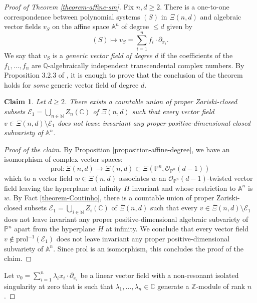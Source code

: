 \documentclass[12pt]{amsart}
\renewcommand{\P}{\mathbb{P}}
\theoremstyle{definition}
\theoremstyle{plain}
\newtheorem{claim}{Claim}
\theoremstyle{exampstyle}
\theoremstyle{exampstyle}\newtheorem{thmxbis}{Theorem}
\numberwithin{equation}{section}
\theoremstyle{remark}
\begin{document}
\begin{proof}[Proof of Theorem \ref{theorem-affine-sm}] 
Fix $n,d \geq 2$. There is a one-to-one correspondence between polynomial systems $(S)$ in $\Xi(n,d)$ and algebraic vector fields $v_S$ on the affine space $\mathbb{A}^n$ of degree $\leq d$ given by 
$$ (S) \mapsto v_S = \sum_{i = 1}^n f_i \cdot \partial_{x_i}.$$
We say that $v_S$ is a {\em generic vector field of degree $d$} if the coefficients of the $f_1,\ldots, f_n$ are $\mathbb{Q}$-algebraically independent transcendental complex numbers. By Proposition 3.2.3 of \cite{jaoui-ANT}, it is enough to prove that the conclusion of the theorem holds for \textit{some} generic vector field of degree $d$. 

\setcounter{claim}{0}

\begin{claim} 
Let $d \geq 2$. There exists a countable union of proper Zariski-closed subsets $ \mathcal E_1 = \bigcup_{n \in \mathbb N} Z_n(\mathbb{C})$ of $\Xi(n,d)$ such that every vector field $v \in \Xi(n,d) \setminus \mathcal E_1$ does not leave invariant any proper positive-dimensional closed subvariety of $\mathbb{A}^n$. 
\end{claim} 


\begin{proof}[Proof of the claim]
By Proposition \ref{proposition-affine-degree}, we have an isomorphism of complex vector spaces: 
$$\mathrm{prol} : \Xi(n,d) \rightarrow \overline{\Xi}(n,d) \subset \Xi(\P^n, \mathcal O_{\P^n}(d - 1))$$
which to a vector field $w \in \Xi(n,d)$ associates $\overline{w}$ an $\mathcal O_{\P^n}(d - 1)$-twisted vector field leaving the hyperplane at infinity $H$ invariant and whose restriction to $\mathbb{A}^n$ is $w$.  By Fact \ref{theorem-Coutinho}, there is  a countable union of proper Zariski-closed subsets $\mathcal E_1 = \bigcup_{i \in \mathbb{N}} Z_i(\mathbb{C})$ of $\overline{\Xi}(n,d)$ such that every $v \in \overline{\Xi}(n,d) \setminus \mathcal E_1$ does not leave invariant any proper positive-dimensional algebraic subvariety of $\P^n$ apart from the hyperplane $H$ at infinity. We conclude that every vector field $v \notin \mathrm{prol}^{-1}(\mathcal E_1)$  does not leave invariant any proper positive-dimensional subvariety of $\mathbb{A}^n$. Since $\mathrm{prol}$ is an isomorphism, this concludes the proof of the claim.
\end{proof}




Let $v_0 = \sum_{i = 1}^n \lambda_ix_i\cdot \partial_{x_i}$
be a linear vector field with a non-resonant isolated singularity at zero that is such that $\lambda_1,\ldots, \lambda_n \in \mathbb{C}$ generate a $\mathbb{Z}$-module of rank $n$. 



\end{proof}
\end{document}
